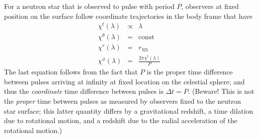 \documentclass[modern]{aastex631}
\newcommand{\rNS}{r_\mathrm{NS}}
\begin{document}
For a neutron star that is observed to pulse with period $P$, observers at fixed
position on the surface follow coordinate trajectories in the body frame that
have 
\begin{eqnarray}
    \chi^t\left( \lambda \right) & \propto & \lambda \\
    \chi^\theta\left( \lambda \right) & = & \mathrm{const} \\
    \chi^r\left( \lambda \right) & = & \rNS \\
    \chi^\phi\left(\lambda \right) & = & \frac{2 \pi \chi^t\left(\lambda \right)}{P}
\end{eqnarray}
The last equation follows from the fact that $P$ is the proper time difference
between pulses arriving at infinity at fixed location on the celestial sphere;
and thus the \emph{coordinate} time difference between pulses is $\Delta t = P$.
(Beware!  This is not the \emph{proper} time between pulses as measured by
observers fixed to the neutron star surface; this latter quantity differs by a
gravitational redshift, a time dilation due to rotational motion, and a redshift
due to the radial acceleration of the rotational motion.)
\end{document}
